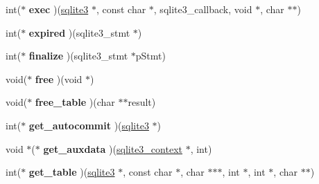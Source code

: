 \begin{DoxyCompactItemize}
\item 
\hypertarget{structsqlite3__api__routines_a16e1fe4f9dccfe8da742d7087822d379}{int($\ast$ {\bfseries exec} )(\hyperlink{structsqlite3}{sqlite3} $\ast$, const char $\ast$, sqlite3\-\_\-callback, void $\ast$, char $\ast$$\ast$)}\label{structsqlite3__api__routines_a16e1fe4f9dccfe8da742d7087822d379}

\item 
\hypertarget{structsqlite3__api__routines_a574080049ce24e639e7487bcfc74e06a}{int($\ast$ {\bfseries expired} )(sqlite3\-\_\-stmt $\ast$)}\label{structsqlite3__api__routines_a574080049ce24e639e7487bcfc74e06a}

\item 
\hypertarget{structsqlite3__api__routines_ad7cee4127bfd0583ccfea40943858de2}{int($\ast$ {\bfseries finalize} )(sqlite3\-\_\-stmt $\ast$p\-Stmt)}\label{structsqlite3__api__routines_ad7cee4127bfd0583ccfea40943858de2}

\item 
\hypertarget{structsqlite3__api__routines_a5778783c18a96cff28a516168db77ae9}{void($\ast$ {\bfseries free} )(void $\ast$)}\label{structsqlite3__api__routines_a5778783c18a96cff28a516168db77ae9}

\item 
\hypertarget{structsqlite3__api__routines_a16d39862f10f54f34e2d52b4da51fdac}{void($\ast$ {\bfseries free\-\_\-table} )(char $\ast$$\ast$result)}\label{structsqlite3__api__routines_a16d39862f10f54f34e2d52b4da51fdac}

\item 
\hypertarget{structsqlite3__api__routines_a8724984acc7ccfefaa17f04a739fc396}{int($\ast$ {\bfseries get\-\_\-autocommit} )(\hyperlink{structsqlite3}{sqlite3} $\ast$)}\label{structsqlite3__api__routines_a8724984acc7ccfefaa17f04a739fc396}

\item 
\hypertarget{structsqlite3__api__routines_af5e805a1a5e4bcdfe26489a448a571a9}{void $\ast$($\ast$ {\bfseries get\-\_\-auxdata} )(\hyperlink{structsqlite3__context}{sqlite3\-\_\-context} $\ast$, int)}\label{structsqlite3__api__routines_af5e805a1a5e4bcdfe26489a448a571a9}

\item 
\hypertarget{structsqlite3__api__routines_a49be6136a17441b04e3feec330d9dd52}{int($\ast$ {\bfseries get\-\_\-table} )(\hyperlink{structsqlite3}{sqlite3} $\ast$, const char $\ast$, char $\ast$$\ast$$\ast$, int $\ast$, int $\ast$, char $\ast$$\ast$)}\label{structsqlite3__api__routines_a49be6136a17441b04e3feec330d9dd52}


\end{DoxyCompactItemize}
